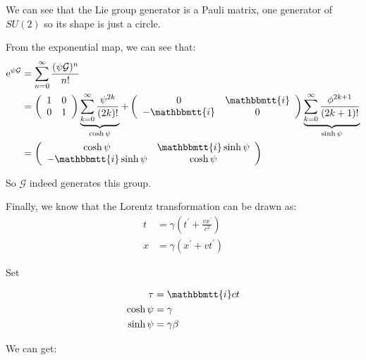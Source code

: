 \documentclass[]{ctexart}
\newcommand{\mi}{\mathbbmtt{i}}
\begin{document}
		We can see that the Lie group generator is a Pauli matrix, one generator of $SU(2)$ so its shape is just a circle. 
		
		From the exponential map, we can see that:
			\begin{equation*}
			\begin{aligned}
				\mathrm{e}^{\psi \mathcal{G}}&=\sum_{n=0}^{\infty} \frac{(\psi \mathcal{G})^{n}}{n !}\\
				&=\left(\begin{array}{cc}
				1 & 0 \\
				0 & 1
				\end{array}\right) \underbrace{\sum_{k=0}^{\infty} \frac{\psi^{2 k}}{(2 k) !}}_{\cosh \psi}+\left(\begin{array}{cc}
				0 & \mi  \\
				-\mi & 0
				\end{array}\right) \underbrace{\sum_{k=0}^{\infty} \frac{\phi^{2 k+1}}{(2 k+1) !}}_{\sinh \psi}\\
				&=\left(\begin{array}{cc}
				\cosh \psi & \mi \sinh \psi \\
				-\mi \sinh \psi & \cosh \psi
				\end{array}\right)
			\end{aligned}
			\end{equation*}
			
		So $\mathcal{G}$ indeed generates this group. 
		
		Finally, we know that the Lorentz transformation can be drawn as:
			\begin{equation*}
			\begin{aligned}
				t &=\gamma\left(t^{\prime}+\frac{v x^{\prime}}{c^{2}}\right) \\
				x &=\gamma\left(x^{\prime}+v t^{\prime}\right)
			\end{aligned}
			\end{equation*}
		
		Set 
		
			\begin{equation*}
			\begin{aligned}
				\tau  &=\mi c t\\
				\cosh \psi &=\gamma \\
				\sinh \psi &=\gamma \beta
			\end{aligned}
			\end{equation*}
		
		We can get:
		
\end{document}
